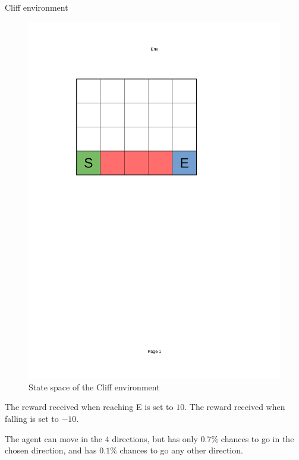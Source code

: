 \documentclass[10pt]{beamer}
\begin{document}
\begin{frame}{Cliff environment}
    \begin{figure}[!ht]
        \centering
    \includegraphics[page=1, trim = 40mm 160mm 70mm 45mm, clip, height=0.4\textheight]{figures/personal_work/policies.pdf}
    \caption{State space of the Cliff environment}
    \end{figure}

    The reward received when reaching E is set to $10$. The reward received when falling is set to $-10$.

    The agent can move in the $4$ directions, but has only $0.7\%$ chances to go in the chosen direction, and has $0.1\%$ chances to go any other direction.
\end{frame}
\end{document}
